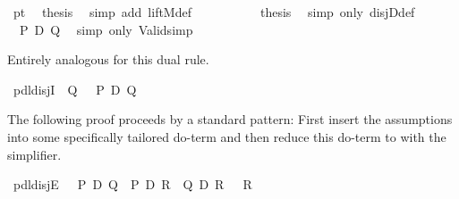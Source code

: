 \begin{isabellebody}
\ pt\ \isamarkupfalse%
\ {\isacharquery}thesis\ \isamarkupfalse%
\ {\isacharparenleft}simp\ add{\isacharcolon}\ liftM{}{\isacharunderscore}def{\isacharparenright}\isanewline
\ \ \ \ \isamarkupfalse%
\isanewline
\ \ \ \ \isamarkupfalse%
\ {\isacharquery}thesis\ \isamarkupfalse%
\ {\isacharparenleft}simp\ only{\isacharcolon}\ disjD{\isacharunderscore}def{\isacharparenright}\isanewline
\ \ \isamarkupfalse%
\isanewline
\ \ \isamarkupfalse%
\ {\isachardoublequote}{\isasymturnstile}\ {\isacharparenleft}P\ {\isasymor}\isactrlsub D\ Q{\isacharparenright}{\isachardoublequote}\ \isamarkupfalse%
\ {\isacharparenleft}simp\ only{\isacharcolon}\ Valid{\isacharunderscore}simp{\isacharparenright}\isanewline
\isamarkupfalse%
\isamarkupfalse%
%
\begin{isamarkuptext}%
Entirely analogous for this dual rule.%
\end{isamarkuptext}%
\isamarkuptrue%
\ pdl{\isacharunderscore}disjI{}{\isacharcolon}\ {\isachardoublequote}{\isasymturnstile}\ Q\ {\isasymLongrightarrow}\ {\isasymturnstile}\ {\isacharparenleft}P\ {\isasymor}\isactrlsub D\ Q{\isacharparenright}{\isachardoublequote}\isamarkupfalse%
\isamarkupfalse%
\isamarkupfalse%
\isamarkupfalse%
\isamarkupfalse%
\isamarkupfalse%
\isamarkupfalse%
\isamarkupfalse%
\isamarkupfalse%
\isamarkupfalse%
\isamarkupfalse%
\isamarkupfalse%
\isamarkupfalse%
\isamarkupfalse%
\isamarkupfalse%
\isamarkupfalse%
\isamarkupfalse%
\isamarkupfalse%
\isamarkupfalse%
\isamarkupfalse%
\isamarkupfalse%
\isamarkupfalse%
\isamarkupfalse%
\isamarkupfalse%
\isamarkupfalse%
\isamarkupfalse%
\isamarkupfalse%
\isamarkupfalse%
\isamarkupfalse%
\isamarkupfalse%
\isamarkupfalse%
\isamarkupfalse%
\isamarkupfalse%
%
\begin{isamarkuptext}%
The following proof proceeds by a standard pattern: First insert the 
  assumptions into some specifically tailored do-term and then 
  reduce this do-term to  with the simplifier.%
\end{isamarkuptext}%
\isamarkuptrue%
\ pdl{\isacharunderscore}disjE{\isacharcolon}\ {\isachardoublequote}{\isasymlbrakk}\ {\isasymturnstile}\ P\ {\isasymor}\isactrlsub D\ Q{\isacharsemicolon}\ {\isasymturnstile}\ P\ {\isasymlongrightarrow}\isactrlsub D\ R{\isacharsemicolon}\ {\isasymturnstile}\ Q\ {\isasymlongrightarrow}\isactrlsub D\ R{\isasymrbrakk}\ {\isasymLongrightarrow}\ {\isasymturnstile}\ R{\isachardoublequote}\isanewline

\end{isabellebody}
